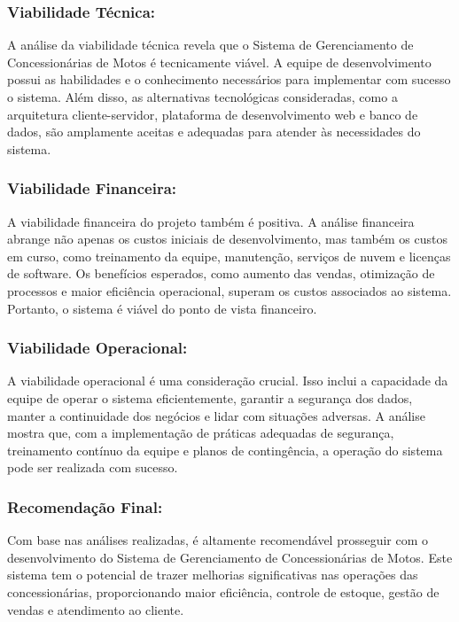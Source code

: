        \subsubsection{Viabilidade Técnica:}
       
       A análise da viabilidade técnica revela que o Sistema de Gerenciamento de Concessionárias de Motos é tecnicamente viável. A equipe de desenvolvimento possui as habilidades e o conhecimento necessários para implementar com sucesso o sistema. Além disso, as alternativas tecnológicas consideradas, como a arquitetura cliente-servidor, plataforma de desenvolvimento web e banco de dados, são amplamente aceitas e adequadas para atender às necessidades do sistema.
       
       \subsubsection{Viabilidade Financeira:}
       
       A viabilidade financeira do projeto também é positiva. A análise financeira abrange não apenas os custos iniciais de desenvolvimento, mas também os custos em curso, como treinamento da equipe, manutenção, serviços de nuvem e licenças de software. Os benefícios esperados, como aumento das vendas, otimização de processos e maior eficiência operacional, superam os custos associados ao sistema. Portanto, o sistema é viável do ponto de vista financeiro.
       
       \subsubsection{Viabilidade Operacional:}
       
       A viabilidade operacional é uma consideração crucial. Isso inclui a capacidade da equipe de operar o sistema eficientemente, garantir a segurança dos dados, manter a continuidade dos negócios e lidar com situações adversas. A análise mostra que, com a implementação de práticas adequadas de segurança, treinamento contínuo da equipe e planos de contingência, a operação do sistema pode ser realizada com sucesso.
       
       \subsubsection{Recomendação Final:}
       
       Com base nas análises realizadas, é altamente recomendável prosseguir com o desenvolvimento do Sistema de Gerenciamento de Concessionárias de Motos. Este sistema tem o potencial de trazer melhorias significativas nas operações das concessionárias, proporcionando maior eficiência, controle de estoque, gestão de vendas e atendimento ao cliente.
       
